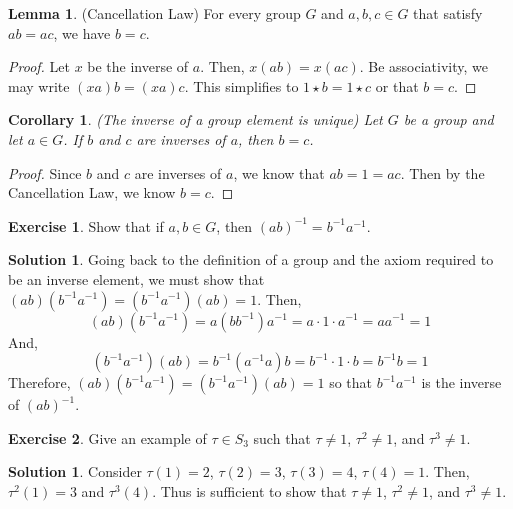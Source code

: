\documentclass[12pt]{article}
\newtheorem{corollary}{Corollary}
\theoremstyle{definition}
\newtheorem{exercise}{Exercise}
\newtheorem{lemma}{Lemma}
\theoremstyle{definition}
\newtheorem{solution}[theorem]{Solution}
\begin{document}
\begin{lemma}(Cancellation Law)
For every group $G$ and $a,b,c \in G$ that satisfy $ab = ac$, we have $b=c$.
\end{lemma}
\begin{proof}
Let $x$ be the inverse of $a$. Then, $x(ab) = x(ac)$. Be associativity, we may write $(xa)b = (xa)c$. This simplifies to $1 \star b = 1 \star c$ or that $b = c$.
\end{proof}

\begin{corollary}(The inverse of a group element is unique)
Let $G$ be a group and let $a \in G$. If $b$ and $c$ are inverses of $a$, then $b = c$. 
\end{corollary}
\begin{proof}
Since $b$ and $c$ are inverses of $a$, we know that $ab = 1 = ac$. Then by the Cancellation Law, we know $b=c$.
\end{proof}

\begin{exercise}
Show that if $a,b \in G$, then $(ab)^{-1} = b^{-1}a^{-1}$.
\end{exercise}
\begin{solution} Going back to the definition of a group and the axiom required to be an inverse element, we must show that $(ab)(b^{-1}a^{-1}) = (b^{-1}a^{-1})(ab) = 1$. Then,
\begin{equation}
(ab)(b^{-1}a^{-1}) = a (bb^{-1}) a^{-1} = a \cdot 1 \cdot a^{-1} = aa^{-1} = 1
\end{equation}
And,
\begin{equation}
(b^{-1}a^{-1})(ab) = b^{-1} (a^{-1}a) b = b^{-1} \cdot 1 \cdot b = b^{-1}b = 1
\end{equation}
Therefore, $(ab)(b^{-1}a^{-1}) = (b^{-1}a^{-1})(ab) = 1$ so that $b^{-1}a^{-1}$ is the inverse of $(ab)^{-1}$.
\end{solution}

\begin{exercise}
Give an example of $\tau \in S_3$ such that $\tau \neq 1$, $\tau^2 \neq 1$, and $\tau^3 \neq 1$.
\end{exercise}
\begin{solution}
Consider $\tau(1) = 2$, $\tau(2) = 3$, $\tau(3) = 4$, $\tau(4) = 1$. Then, $\tau^2(1) = 3$ and $\tau^3(4)$. Thus is sufficient to show that $\tau \neq 1$, $\tau^2 \neq 1$, and $\tau^3 \neq 1$.
\end{solution}
\end{document}

